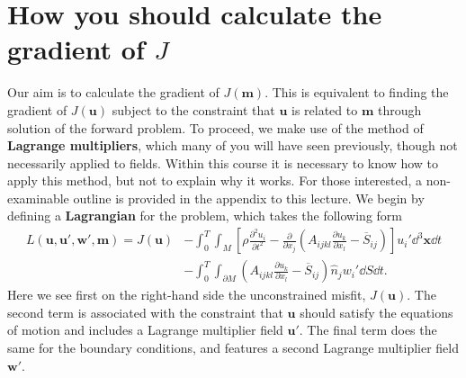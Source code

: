 \section*{How you should calculate the gradient of $J$}
Our aim is to calculate the gradient of $J(\mathbf{m})$. This is equivalent to finding the gradient 
of $J(\mathbf{u})$ subject to the constraint that $\mathbf{u}$ is related to $\mathbf{m}$ through solution 
of the forward problem. To proceed, we make use of the method of \textbf{Lagrange multipliers}, which many 
of you will have seen previously, though not necessarily applied to fields. Within this course it is necessary 
to know how to apply this method, but not to explain why it works. For those interested, a non-examinable 
outline is provided in the appendix to this lecture. We begin by defining a \textbf{Lagrangian} for the problem, which takes the following form
\begin{align}
L(\mathbf{u},\mathbf{u}',\mathbf{w}',\mathbf{m}) = J(\mathbf{u}) &- \int_{0}^{T}\int_{M}\left[\rho\frac{\partial^{2}u_{i}}{\partial t^{2}}-\frac{\partial}{\partial x_{j}}\left(A_{ijkl}\frac{\partial u_{k}}{\partial x_{l}}-\overline{S}_{ij}\right)\right]u_{i}'\dd^{3}\mathbf{x}\dd t \nonumber \\
&- \int_{0}^{T}\int_{\partial M}\left(A_{ijkl}\frac{\partial u_{k}}{\partial x_{l}}-\overline{S}_{ij}\right)\hat{n}_{j}w_{i}'\dd S\dd t.
\label{eq:9}
\end{align}
Here we see first on the right-hand side the unconstrained misfit, $J(\mathbf{u})$. The second term is associated with 
the constraint that $\mathbf{u}$ should satisfy the equations of motion and includes a 
Lagrange multiplier field $\mathbf{u}'$. The final term does the same for the boundary conditions, and 
features a second Lagrange multiplier field $\mathbf{w}'$. 

